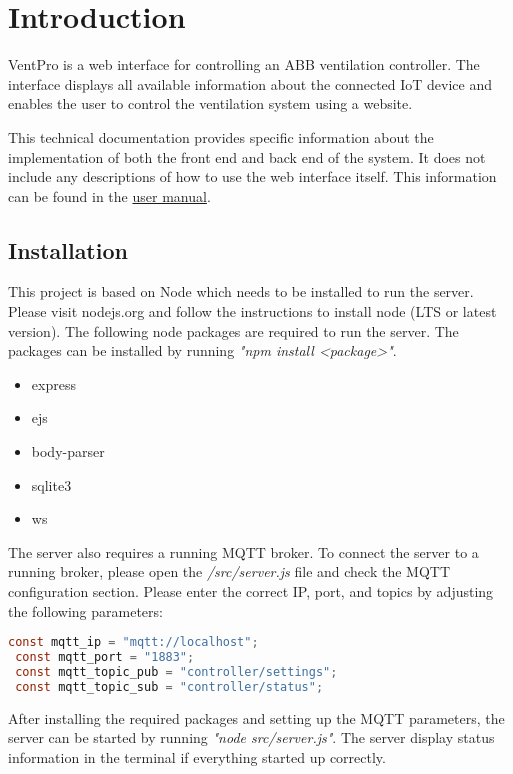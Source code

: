 
\chapter{Introduction}
\label{ch:introduction}

VentPro is a web interface for controlling an ABB ventilation controller. The interface displays all available information about the connected IoT device and enables the user to control the ventilation system using a website. 

This technical documentation provides specific information about the implementation of both the front end and back end of the system. It does not include any descriptions of how to use the web interface itself. This information can be found in the  \href{https://github.com/sischae/Internet_of_Things_Project/blob/main/doc/user_manual/user_manual.pdf}{user manual}.





\section{Installation}
\label{sec:installation}

This project is based on Node which needs to be installed to run the server. Please visit nodejs.org and follow the instructions to install node (LTS or latest version). The following node packages are required to run the server. The packages can be installed by running \textit{"npm install <package>"}.

\begin{itemize}
	\item express
    \item ejs
    \item body-parser
    \item sqlite3
    \item ws
\end{itemize}

The server also requires a running MQTT broker. To connect the server to a running broker, please open the \textit{/src/server.js} file and check the MQTT configuration section. Please enter the correct IP, port, and topics by adjusting the following parameters:

\begin{lstlisting}[language = Java, numbers = none]
 const mqtt_ip = "mqtt://localhost";
 const mqtt_port = "1883";
 const mqtt_topic_pub = "controller/settings";
 const mqtt_topic_sub = "controller/status";
\end{lstlisting}

After installing the required packages and setting up the MQTT parameters, the server can be started by running \textit{"node src/server.js"}. The server display status information in the terminal if everything started up correctly.